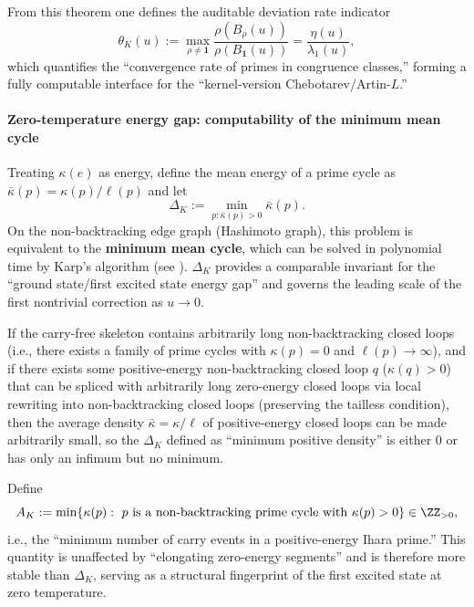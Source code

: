From this theorem one defines the auditable deviation rate indicator
\[
\theta_K(u):=\max_{\rho\neq\mathbf 1}\frac{\rho(B_\rho(u))}{\rho(B_{\mathbf 1}(u))}
=\frac{\eta(u)}{\lambda_1(u)},
\]
which quantifies the ``convergence rate of primes in congruence classes,'' forming a fully computable interface for the ``kernel-version Chebotarev/Artin-\(L\).''

\paragraph{Zero-temperature energy gap: computability of the minimum mean cycle}
Treating $\kappa(e)$ as energy, define the mean energy of a prime cycle as
\(
\bar\kappa(p)=\kappa(p)/\ell(p)
\)
and let
\[
\Delta_K:=\min_{p:\bar\kappa(p)>0}\bar\kappa(p).
\]
On the non-backtracking edge graph (Hashimoto graph), this problem is equivalent to the \textbf{minimum mean cycle}, which can be solved in polynomial time by Karp's algorithm (see \cite{Karp1978MinCycleMean}). $\Delta_K$ provides a comparable invariant for the ``ground state/first excited state energy gap'' and governs the leading scale of the first nontrivial correction as $u\to 0$.

\begin{proposition}\label{prop:ihara-gap-degeneracy}
If the carry-free skeleton contains arbitrarily long non-backtracking closed loops (i.e., there exists a family of prime cycles with \(\kappa(p)=0\) and \(\ell(p)\to\infty\)), and if there exists some positive-energy non-backtracking closed loop \(q\) (\(\kappa(q)>0\)) that can be spliced with arbitrarily long zero-energy closed loops via local rewriting into non-backtracking closed loops (preserving the tailless condition), then the average density \(\bar\kappa=\kappa/\ell\) of positive-energy closed loops can be made arbitrarily small, so the \(\Delta_K\) defined as ``minimum positive density'' is either \(0\) or has only an infimum but no minimum.
\end{proposition}

\begin{definition}\label{def:ihara-tunneling-action}
Define
$$
A_K:=\min\{\kappa(p):\ p\ \text{is a non-backtracking prime cycle with}\ \kappa(p)>0\}\in\ZZ_{>0},
$$
i.e., the ``minimum number of carry events in a positive-energy Ihara prime.'' This quantity is unaffected by ``elongating zero-energy segments'' and is therefore more stable than \(\Delta_K\), serving as a structural fingerprint of the first excited state at zero temperature.
\end{definition}

